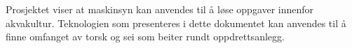 Prosjektet viser at maskinsyn kan anvendes til å løse oppgaver innenfor akvakultur. Teknologien som presenteres i dette dokumentet kan anvendes til å finne omfanget av torsk og sei som beiter rundt oppdrettsanlegg.%







